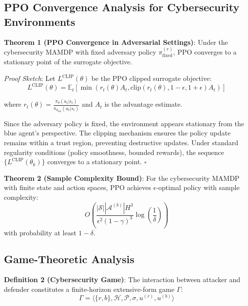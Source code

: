 \documentclass[12pt]{article}
\theoremstyle{definition}
\theoremstyle{plain}
\begin{document}
\subsection{PPO Convergence Analysis for Cybersecurity Environments}

\textbf{Theorem 1 (PPO Convergence in Adversarial Settings)}: Under the cybersecurity MAMDP with fixed adversary policy $\pi^{(r)}_{\text{fixed}}$, PPO converges to a stationary point of the surrogate objective.

\textit{Proof Sketch}: 
Let $L^{\text{CLIP}}(\theta)$ be the PPO clipped surrogate objective:
\begin{equation}
L^{\text{CLIP}}(\theta) = \mathbb{E}_t \left[ \min\left( r_t(\theta) A_t, \text{clip}(r_t(\theta), 1-\epsilon, 1+\epsilon) A_t \right) \right]
\end{equation}

where $r_t(\theta) = \frac{\pi_\theta(a_t|s_t)}{\pi_{\theta_{\text{old}}}(a_t|s_t)}$ and $A_t$ is the advantage estimate.

Since the adversary policy is fixed, the environment appears stationary from the blue agent's perspective. The clipping mechanism ensures the policy update remains within a trust region, preventing destructive updates. Under standard regularity conditions (policy smoothness, bounded rewards), the sequence $\{L^{\text{CLIP}}(\theta_k)\}$ converges to a stationary point. $\square$

\textbf{Theorem 2 (Sample Complexity Bound)}: For the cybersecurity MAMDP with finite state and action spaces, PPO achieves $\epsilon$-optimal policy with sample complexity:
\begin{equation}
O\left( \frac{|\mathcal{S}||\mathcal{A}^{(b)}| H^3}{\epsilon^2 (1-\gamma)^3} \log\left(\frac{1}{\delta}\right) \right)
\end{equation}
with probability at least $1-\delta$.

\subsection{Game-Theoretic Analysis}

\textbf{Definition 2 (Cybersecurity Game)}: The interaction between attacker and defender constitutes a finite-horizon extensive-form game $\Gamma$:
\begin{equation}
\Gamma = \langle \{r,b\}, \mathcal{H}, \mathcal{P}, \sigma, u^{(r)}, u^{(b)} \rangle
\end{equation}
\end{document}
